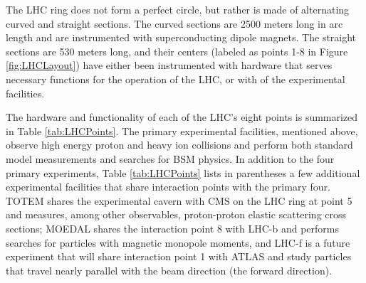 The LHC ring does not form a perfect circle, but rather is made of alternating curved and straight sections. The curved sections are 2500 meters long in arc length and are instrumented with superconducting dipole magnets. The straight sections are 530 meters long, and their centers (labeled as points 1-8 in Figure \ref{fig:LHCLayout}) have either been instrumented with hardware that serves necessary functions for the operation of the LHC, or with of the experimental facilities. 

The hardware and functionality of each of the LHC's eight points is summarized in Table \ref{tab:LHCPoints}.  The primary experimental facilities, mentioned above, observe high energy proton and heavy ion collisions and perform both standard model measurements and searches for BSM physics. In addition to the four primary experiments, Table \ref{tab:LHCPoints} lists in parentheses a few additional experimental facilities that share interaction points with the primary four. TOTEM shares the experimental cavern with CMS on the LHC ring at point 5 and measures, among other observables, proton-proton elastic scattering cross sections; MOEDAL shares the interaction point 8 with LHC-b and performs searches for particles with magnetic monopole moments, and LHC-f is a future experiment that will share interaction point 1 with ATLAS and study particles that travel nearly parallel with the beam direction (the forward direction).


